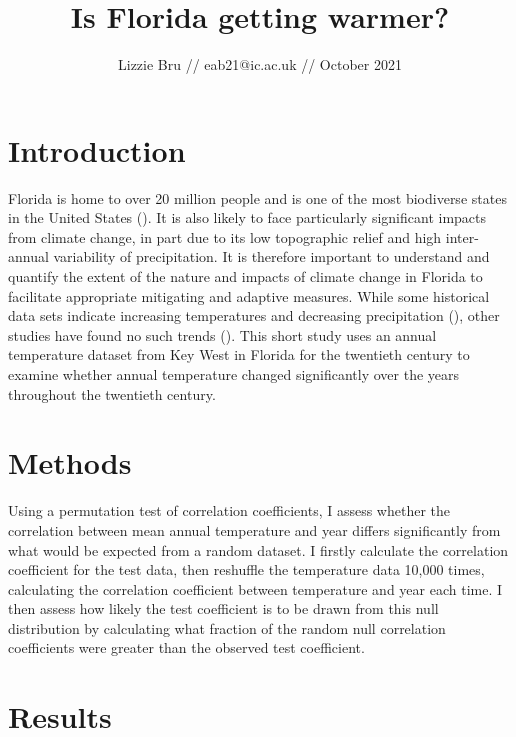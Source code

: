 \documentclass{article}
\title{\textbf{Is Florida getting warmer?\vspace{-0.5em}}}
\author{Lizzie Bru // eab21@ic.ac.uk // October 2021}
\date{}
\begin{document}
\maketitle

\section{Introduction \vspace{-0.5em}}

    Florida is home to over 20 million people and is one of the most biodiverse states in the United States (\cite{usda}). It is also likely to face particularly significant impacts from climate change, in part due to its low topographic relief and high inter-annual variability of precipitation. It is therefore important to understand and quantify the extent of the nature and impacts of climate change in Florida to facilitate appropriate mitigating and adaptive measures. While some historical data sets indicate increasing temperatures and decreasing precipitation (\cite{irizarry2013historical}), other studies have found no such trends (\cite{obeysekera2011climate}). This short study uses an annual temperature dataset from Key West in Florida for the twentieth century to examine whether annual temperature changed significantly over the years throughout the twentieth century. \vspace{-1em}

\section{Methods \vspace{-0.5em}}

Using a permutation test of correlation coefficients, I assess whether the correlation between mean annual temperature and year differs significantly from what would be expected from a random dataset. I firstly calculate the correlation coefficient for the test data, then reshuffle the temperature data 10,000 times, calculating the correlation coefficient between temperature and year each time. I then assess how likely the test coefficient is to be drawn from this null distribution by calculating what fraction of the random null correlation coefficients were greater than the observed test coefficient. \vspace{-1em}

\section{Results \vspace{-0.5em}}
\end{document}
